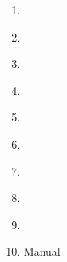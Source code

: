 \documentclass[fleqn,usenatbib]{rasti}
\begin{document}
\begin{enumerate}
    \item \citet{2008MNRAS.387.1693C}
    \item \citet[][two-part]{2008MNRAS.387.1693C}
    \item \citet{2009ApJ...692.1013S}
    \item \citet[][two-part]{2009ApJ...692.1013S}
    \item \citet{2009ApJ...693..355W}
    \item \citet{2009ApJ...705..408K}
    \item \citet[][two-part]{2009ApJ...705..408K}
    \item \citet{2018ApJ...866...21C}
    \item \citet{2018ApJ...860L..17E}
    \item Manual
\end{enumerate}
\end{document}
